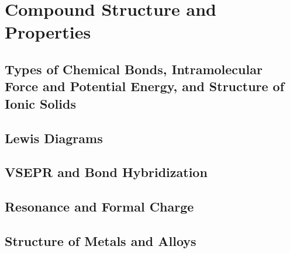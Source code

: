 \documentclass[../chem.tex]{subfiles}
\begin{document}
\chapter{Compound Structure and Properties}
\section{Types of Chemical Bonds, Intramolecular Force and Potential Energy, and Structure of Ionic Solids}
\section{Lewis Diagrams}
\section{VSEPR and Bond Hybridization}
\section{Resonance and Formal Charge}
\section{Structure of Metals and Alloys}
\end{document}
